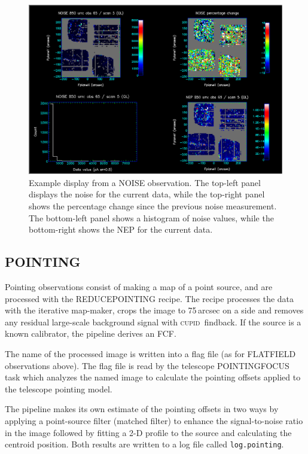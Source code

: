 \documentclass[twoside,11pt]{article}
\renewcommand{\_}{\texttt{\symbol{95}}}
\newcommand{\CUPID}{\textsc{cupid}}
\newcommand{\task}[1]{\textsf{#1}}
\begin{document}
\begin{figure}[t]
\centering
\includegraphics[width=\textwidth]{sun264_noise.eps}
\caption{Example display from a NOISE observation. The top-left panel
  displays the noise for the current data, while the top-right panel
  shows the percentage change since the previous noise
  measurement. The bottom-left panel shows a histogram of noise
  values, while the bottom-right shows the NEP for the current
  data.\label{fig:noise}}
\end{figure}

\subsection{POINTING}

Pointing observations consist of making a map of a point source, and
are processed with the \task{REDUCE\_POINTING} recipe. The recipe
processes the data with the iterative map-maker, crops the image to
75\,arcsec on a side and removes any residual large-scale background
signal with \CUPID\ \task{findback}. If the source is a known
calibrator, the pipeline derives an FCF.

The name of the processed image is written into a flag file (as for
FLATFIELD observations above). The flag file is read by the telescope
POINTING\_FOCUS task which analyzes the named image to calculate the
pointing offsets applied to the telescope pointing model.

The pipeline makes its own estimate of the pointing offsets in two
ways by applying a point-source filter (matched filter) to enhance the
signal-to-noise ratio in the image followed by fitting a 2-D profile
to the source and calculating the centroid position. Both results are
written to a log file called \verb+log.pointing+.
\end{document}
